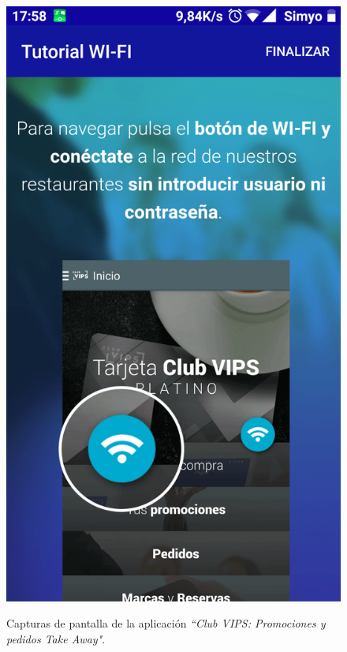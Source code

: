 \documentclass[twoside]{report}
\begin{document}
\begin{figure}[H]
\begin{center}
\includegraphics[scale=0.25]{images/restaurantes/vips2.png}
\caption{Capturas de pantalla de la aplicación \textit{“Club VIPS: Promociones y pedidos Take Away"}.} \cite{vipsapp}
\end{center}
\end{figure}
\end{document}
